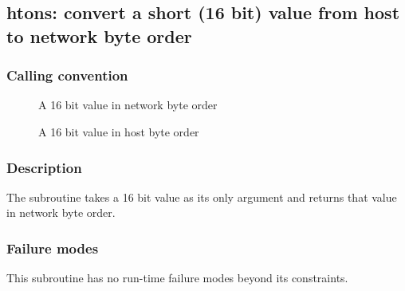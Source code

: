 \clearpage
{}
{}
\label{subr:htons}
\subsection*{htons: convert a short (16 bit) value from host to network
byte order}

\subsubsection*{Calling convention}

\begin{description}
\item[] A 16 bit value in network byte order
\item[] A 16 bit value in host byte order
\end{description}

\subsubsection*{Description}

The  subroutine takes a 16 bit value as its only
argument and returns that value in network byte order.

\subsubsection*{Failure modes}

This subroutine has no run-time failure modes beyond its constraints.

